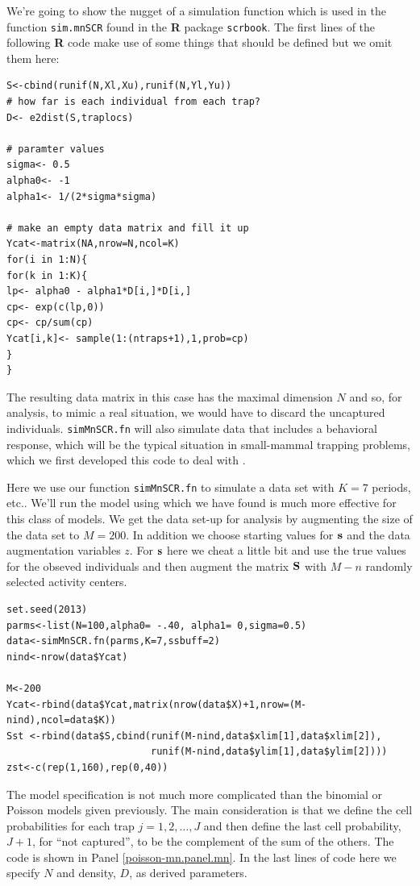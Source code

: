 We're going to show the nugget of a simulation function which is
used in the function \mbox{\tt sim.mnSCR} found in the {\bf R} package
\mbox{\tt scrbook}.  The first lines of the following {\bf R} code
make use of some things that should be defined but we omit them here:
{\small
\begin{verbatim}
S<-cbind(runif(N,Xl,Xu),runif(N,Yl,Yu))
# how far is each individual from each trap?
D<- e2dist(S,traplocs)

# paramter values
sigma<- 0.5
alpha0<- -1
alpha1<- 1/(2*sigma*sigma)

# make an empty data matrix and fill it up
Ycat<-matrix(NA,nrow=N,ncol=K)
for(i in 1:N){
for(k in 1:K){
lp<- alpha0 - alpha1*D[i,]*D[i,]
cp<- exp(c(lp,0))
cp<- cp/sum(cp)
Ycat[i,k]<- sample(1:(ntraps+1),1,prob=cp)
}
}
\end{verbatim}
}
The resulting data matrix in this case has the maximal dimension $N$
and so, for analysis, to mimic a real situation, we would have to
discard the uncaptured individuals.  \mbox{\tt simMnSCR.fn} will also
simulate data that includes a behavioral response, which will be the
typical situation in small-mammal trapping problems, which we first
developed this code to deal with \citep[see][for
details]{converse_royle:2012}.

Here we use our function \mbox{\tt simMnSCR.fn} to simulate a data set
with $K=7$ periods, etc.. We'll run the model using \jags which 
we have found is much more effective for this class of models.  We get
the data set-up for analysis by augmenting the size of the data set to
$M=200$. In addition we choose starting values for ${\bf s}$ and the
data augmentation variables $z$.  For ${\bf s}$ here we cheat a little
bit and use the true values for the obseved individuals and then
augment the matrix ${\bf S}$ with $M-n$ randomly selected activity
centers.

{\small 
\begin{verbatim}
set.seed(2013)
parms<-list(N=100,alpha0= -.40, alpha1= 0,sigma=0.5)
data<-simMnSCR.fn(parms,K=7,ssbuff=2)
nind<-nrow(data$Ycat)

M<-200
Ycat<-rbind(data$Ycat,matrix(nrow(data$X)+1,nrow=(M-nind),ncol=data$K))
Sst <-rbind(data$S,cbind(runif(M-nind,data$xlim[1],data$xlim[2]),
                         runif(M-nind,data$ylim[1],data$ylim[2])))
zst<-c(rep(1,160),rep(0,40))
\end{verbatim}
}

The model specification is not much more complicated than the binomial
or Poisson models given previously. The main consideration is that we
define the cell probabilities for each trap $j=1,2,\dots,J$ and then
define the last cell probability, $J+1$, for ``not captured'', to be
the complement of the sum of the others. The code is shown in Panel
\ref{poisson-mn.panel.mn}.  In the last lines of code here we specify
$N$ and density, $D$, as derived parameters.

